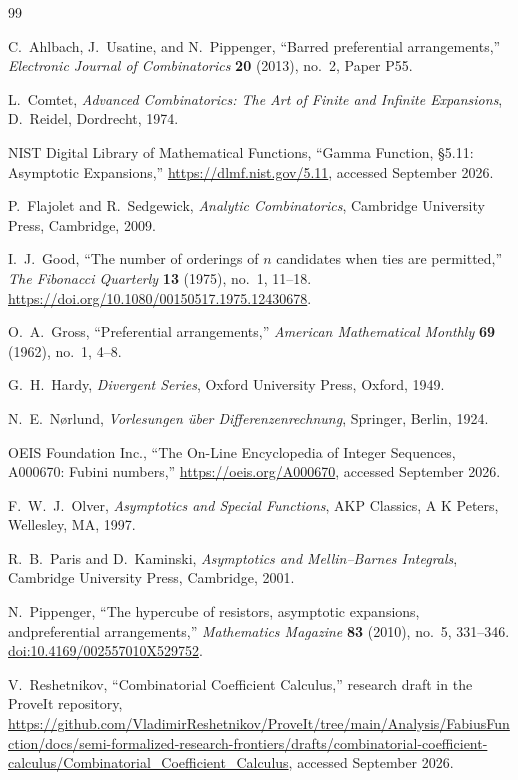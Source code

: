 \documentclass[11pt,a4paper,oneside]{article}
\theoremstyle{definition}
\theoremstyle{remark}
\begin{document}
\begin{thebibliography}{99}\sloppy\raggedright

C.~Ahlbach, J.~Usatine, and N.~Pippenger,
``Barred preferential arrangements,''
\emph{Electronic Journal of Combinatorics} \textbf{20} (2013), no.~2,
Paper P55.

L.~Comtet,
\emph{Advanced Combinatorics: The Art of Finite and Infinite Expansions},
D.~Reidel, Dordrecht, 1974.

NIST Digital Library of Mathematical Functions,
``Gamma Function, \S5.11: Asymptotic Expansions,''
\url{https://dlmf.nist.gov/5.11}, accessed September 2026.

P.~Flajolet and R.~Sedgewick,
\emph{Analytic Combinatorics}, Cambridge University Press, Cambridge, 2009.

I.~J.~Good,
``The number of orderings of $n$ candidates when ties are permitted,''
\emph{The Fibonacci Quarterly} \textbf{13} (1975), no.~1, 11--18.
\url{https://doi.org/10.1080/00150517.1975.12430678}.

O.~A.~Gross,
``Preferential arrangements,''
\emph{American Mathematical Monthly} \textbf{69} (1962), no.~1, 4--8.

G.~H.~Hardy,
\emph{Divergent Series}, Oxford University Press, Oxford, 1949.

N.~E.~N\o rlund,
\emph{Vorlesungen \"uber Differenzenrechnung}, Springer, Berlin, 1924.

OEIS Foundation Inc.,
``The On-Line Encyclopedia of Integer Sequences, A000670: Fubini numbers,''
\url{https://oeis.org/A000670}, accessed September 2026.

F.~W.~J.~Olver,
\emph{Asymptotics and Special Functions}, AKP Classics, A K Peters,
Wellesley, MA, 1997.

R.~B.~Paris and D.~Kaminski,
\emph{Asymptotics and Mellin--Barnes Integrals},
Cambridge University Press, Cambridge, 2001.

N.~Pippenger,
``The hypercube of resistors, asymptotic expansions, and\linebreak[3]
preferential arrangements,''
\emph{Mathematics Magazine} \textbf{83} (2010), no.~5, 331--346.
\href{https://doi.org/10.4169/002557010X529752}{doi:10.4169/002557010X529752}.

V.~Reshetnikov,
``Combinatorial Coefficient Calculus,'' research draft in the ProveIt
repository,
\url{https://github.com/VladimirReshetnikov/ProveIt/tree/main/Analysis/FabiusFunction/docs/semi-formalized-research-frontiers/drafts/combinatorial-coefficient-calculus/Combinatorial_Coefficient_Calculus},
accessed September 2026.


\end{thebibliography}
\end{document}
